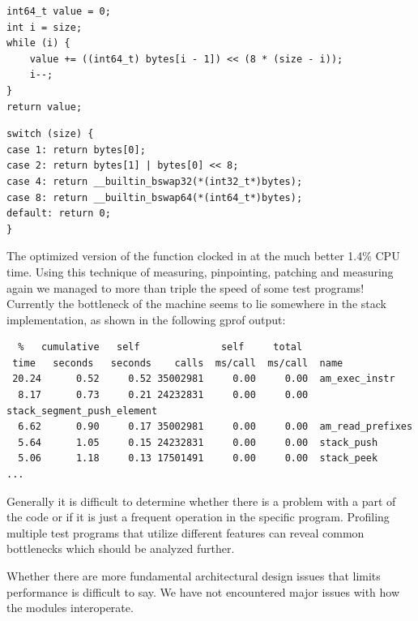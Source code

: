 \begin{minipage}{\linewidth}
\begin{lstlisting}[language={[ANSI]C},%
  caption={The function \code{bytes2int} before optimization.},%
  label={lst:eval:gprof-pre}]
int64_t value = 0;
int i = size;
while (i) {
    value += ((int64_t) bytes[i - 1]) << (8 * (size - i));
    i--;
}
return value;
\end{lstlisting}
\end{minipage}

\begin{minipage}{\linewidth}
\begin{lstlisting}[language={[ANSI]C},%
  caption={The function \code{bytes2int} after optimization},%
  label={lst:eval:gprof-post}]
switch (size) {
case 1: return bytes[0];
case 2: return bytes[1] | bytes[0] << 8;
case 4: return __builtin_bswap32(*(int32_t*)bytes);
case 8: return __builtin_bswap64(*(int64_t*)bytes);
default: return 0;
}
\end{lstlisting}
\end{minipage}

The optimized version of the function clocked in at the much better 1.4\% CPU
time. Using this technique of measuring, pinpointing, patching and measuring
again we managed to more than triple the speed of some test programs! Currently
the bottleneck of the machine seems to lie somewhere in the stack
implementation, as shown in the following gprof output:

\begin{minipage}{\linewidth}
\begin{verbatim}
  %   cumulative   self              self     total
 time   seconds   seconds    calls  ms/call  ms/call  name
 20.24      0.52     0.52 35002981     0.00     0.00  am_exec_instr
  8.17      0.73     0.21 24232831     0.00     0.00  stack_segment_push_element
  6.62      0.90     0.17 35002981     0.00     0.00  am_read_prefixes
  5.64      1.05     0.15 24232831     0.00     0.00  stack_push
  5.06      1.18     0.13 17501491     0.00     0.00  stack_peek
...
\end{verbatim}
\end{minipage}

Generally it is difficult to determine whether there is a problem with a part of
the code or if it is just a frequent operation in the specific
program. Profiling multiple test programs that utilize different features can
reveal common bottlenecks which should be analyzed further.

Whether there are more fundamental architectural design issues that limits
performance is difficult to say. We have not encountered major issues with how
the modules interoperate.

